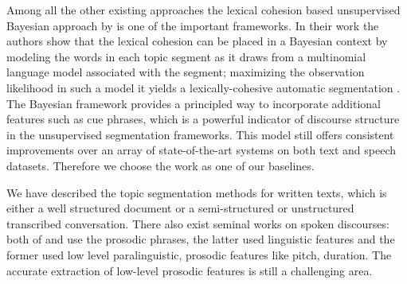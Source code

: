 \documentclass{article}
\begin{document}
Among all the other existing approaches the lexical cohesion based unsupervised Bayesian approach by \cite{eisenstein-08} is one of the important frameworks. In their work the authors show that the lexical cohesion can be placed in a Bayesian context by modeling the words in each topic segment as it draws from a multinomial language model associated with the segment; maximizing the observation likelihood in such a model it yields a lexically-cohesive automatic segmentation \cite{eisenstein-08}. The Bayesian framework provides a principled way to incorporate additional features such as cue phrases, which is a powerful indicator of discourse structure in the unsupervised segmentation frameworks.  %
This model still offers consistent improvements over an array of state-of-the-art systems on both text and speech datasets. Therefore we choose the work as one of our baselines. %


We have described the topic segmentation methods for written texts, which is either a well structured document or a semi-structured or unstructured transcribed conversation. There also exist seminal works on spoken discourses: both of \cite{hirschberg-96} and \cite{niekrasz-09} use the prosodic phrases, the latter used linguistic features and the former used low level paralinguistic, prosodic features like pitch, duration. The accurate extraction of low-level prosodic features is still a challenging area. 
\end{document}
